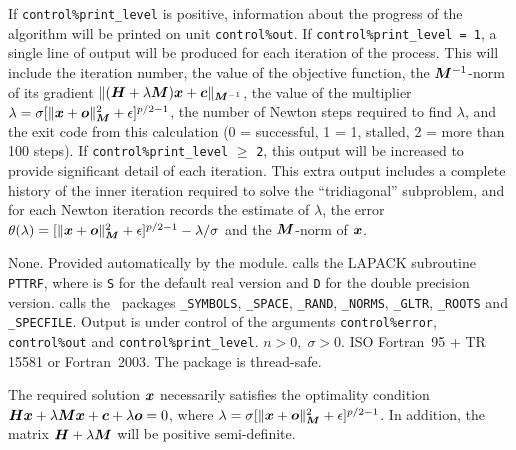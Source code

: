 \documentclass{galahad}
\newcommand{\packagename}{GL\-RT}
\begin{document}

\galinfo
If {\tt control\%print\_level} is positive, information about the progress
of the algorithm will be printed on unit {\tt control\-\%\-out}.
If {\tt control\%print\_level = 1}, a single line of output will be produced
for each iteration of the process. This will include
the iteration number, the value of the objective function, the
${\bm{M}}^{-1}$-norm of its gradient
$\| ( {\bm{H}} + \lambda {\bm{M}} ) {\bm{x}} + {\bm{c}} \|_{{\bm{M}}^{-1}}$,
the value of the multiplier $\lambda =
\sigma [ \|{\bm{x}}+{\bm{o}}\|_{{\bm{M}}}^2 + \epsilon ]^{p/2-1}$,
the number of Newton steps required to find $\lambda$, and the exit
code from this calculation (0 = successful, 1 = 1, stalled, 2 = more than
100 steps).
If {\tt control\%print\_level} $\geq$ {\tt 2}, this
output will be increased to provide significant detail of each iteration.
This extra output includes a complete history of the inner iteration required
to solve the ``tridiagonal'' subproblem, and for each Newton iteration records
the estimate of $\lambda$, the error
$\theta(\lambda) = [ \|{\bm{x}}+{\bm{o}}\|_{{\bm{M}}}^2 + \epsilon ]^{p/2-1}
- \lambda / \sigma$ and the ${\bm{M}}$-norm of ${\bm{x}}$.


\galgeneral

\galcommon None.
\galworkspace Provided automatically by the module.
\galroutines {\tt \packagename\_solve} calls the LAPACK subroutine
{\tt *PTTRF}, where {\tt *} is {\tt S} for
the default real version and {\tt D} for the double precision version.
\galmodules {\tt \packagename\_solve} calls the \galahad\ packages
{\tt \libraryname\_SY\-M\-BOLS},
{\tt \libraryname\_SPACE},
{\tt \libraryname\_RAND},
{\tt \libraryname\_\-NORMS},
{\tt \libraryname\_\-GLTR},
{\tt \libraryname\_\-ROOTS} and
{\tt \libraryname\_SPECFILE}.
\galio Output is under control of the arguments
{\tt control\%error}, {\tt control\%out} and {\tt control\%print\_level}.
\galrestrictions $n  >  0, \;  \sigma  >  0$.
\galportability ISO Fortran~95 + TR 15581 or Fortran~2003.
The package is thread-safe.


\galmethod
The required solution ${\bm{x}}$ necessarily satisfies the optimality condition
${\bm{H}} {\bm{x}} + \lambda {\bm{M}} {\bm{x}} + {\bm{c}} + \lambda {\bm{o}} = 0$, where
$\lambda = \sigma [ \|{\bm{x}}+{\bm{o}}\|_{{\bm{M}}}^2 + \epsilon ]^{p/2-1}$.
In addition, the matrix ${\bm{H}} + \lambda {\bm{M}}$ will be positive semi-definite.
\end{document}
